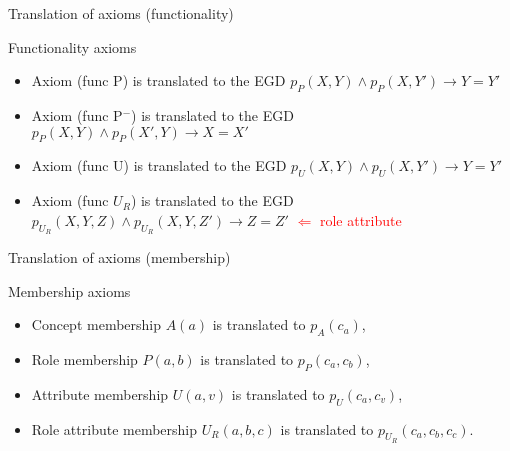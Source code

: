 \documentclass{beamer}
\begin{document}
 
 \begin{frame}{Translation of axioms (functionality)}
 
 \begin{block}{Functionality axioms}
 \small
 \begin{itemize}
 \item Axiom (\textsf{func P}) is translated to the EGD $p_P(X,Y) \wedge p_P(X,Y') \rightarrow Y = Y'$
 \item Axiom (\textsf{func P$^-$}) is translated to the EGD $p_P(X,Y) \wedge p_P(X',Y) \rightarrow X = X'$
 \item  Axiom (\textsf{func U}) is translated to the EGD $p_U(X,Y) \wedge p_U(X,Y') \rightarrow Y = Y'$
 \item Axiom (\textsf{func $U_R$}) is translated to the EGD $p_{U_R}(X,Y,Z) \wedge p_{U_R}(X,Y, Z') \rightarrow Z = Z'$ \textcolor{red}{$\Leftarrow$ role attribute}
 \end{itemize}
 \end{block}
 
 \end{frame}
 
 \begin{frame}{Translation of axioms (membership)}
 
  \begin{block}{Membership axioms}
 \small
 \begin{itemize}
 \item Concept membership $A(a)$ is translated to $p_A(c_a)$,
 \item Role membership $P(a,b)$  is translated to $p_P(c_a, c_b)$,
 \item Attribute membership $U(a,v)$  is translated to $p_U(c_a, c_v)$,
 \item Role attribute membership $U_R(a,b,c)$ is translated to $p_{U_R}(c_a, c_b, c_c)$.
 \end{itemize}
 \end{block}
 
 \end{frame}
 
 
 
\end{document}
